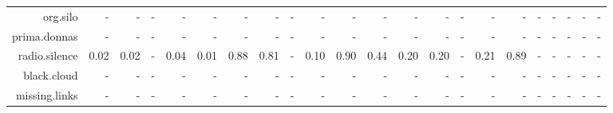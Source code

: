 \documentclass{article}
\begin{document}
\begin{center}
\begin{tabular}{rrrrrrrrrrrrrrrrrrrrrr}
  \hline
org.silo & - & - & - & - & - & - & - & - & - & - & - & - & - & - & - & - & - & - & - & - & - \\ 
  prima.donnas & - & - & - & - & - & - & - & - & - & - & - & - & - & - & - & - & - & - & - & - & - \\ 
  radio.silence & 0.02 & 0.02 & - & 0.04 & 0.01 & 0.88 & 0.81 & - & 0.10 & 0.90 & 0.44 & 0.20 & 0.20 & - & 0.21 & 0.89 & - & - & - & - & - \\ 
  black.cloud & - & - & - & - & - & - & - & - & - & - & - & - & - & - & - & - & - & - & - & - & - \\ 
  missing.links & - & - & - & - & - & - & - & - & - & - & - & - & - & - & - & - & - & - & - & - & - \\ 
   \hline
\end{tabular}

\end{center}
 
\end{document}

